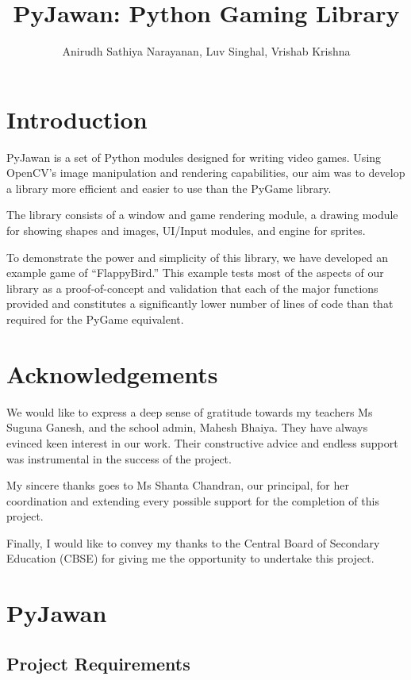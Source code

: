 \documentclass[11pt]{article}
\title{PyJawan: Python Gaming Library}
\author{Anirudh Sathiya Narayanan, Luv Singhal, Vrishab Krishna}
\date{}
\begin{document}
\maketitle
\newpage

\tableofcontents

\newpage

\section{Introduction}
PyJawan is a set of Python modules designed for writing video games. Using OpenCV’s image manipulation and rendering capabilities, our aim was to develop a library more efficient and easier to use than the PyGame library. 

The library consists of a window and game rendering module, a drawing module for showing shapes and images, UI/Input modules, and engine for sprites. 

To demonstrate the power and simplicity of this library, we have developed an example game of “FlappyBird.” This example tests most of the aspects of our library as a proof-of-concept and validation that each of the major functions provided and constitutes a significantly lower number of lines of code than that required for the PyGame equivalent.

\section{Acknowledgements}
We would like to express a deep sense of gratitude towards my teachers Ms Suguna Ganesh, and the school admin, Mahesh Bhaiya. They have always evinced keen interest in our work. Their constructive advice and endless support was instrumental in the success of the project.

My sincere thanks goes to Ms Shanta Chandran, our principal, for her coordination and extending every possible support for the completion of this project.

Finally, I would like to convey my thanks to the Central Board of Secondary Education (CBSE) for giving me the opportunity to undertake this project.

\newpage

\section{PyJawan}

\subsection{Project Requirements}
\end{document}
